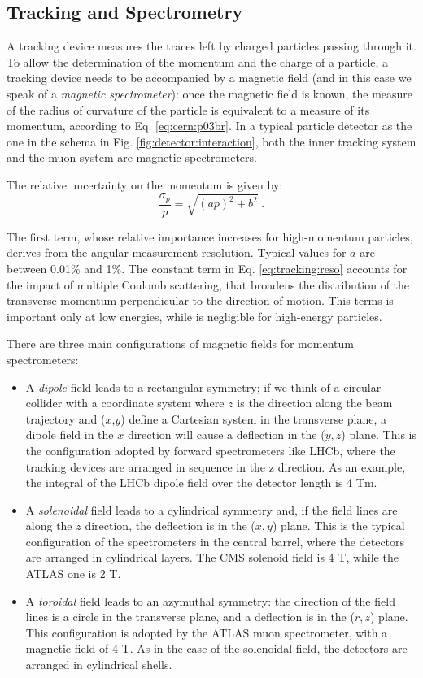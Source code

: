 \subsection{Tracking and Spectrometry}
\label{sec:dec:tracking}
A tracking device measures the traces left by charged particles passing through it. To allow the determination of the momentum and the charge of a particle, a tracking device needs to be accompanied by a magnetic field (and in this case we speak of a \textit{magnetic spectrometer}): once the magnetic field is known, the measure of the radius of curvature of the particle is equivalent to a measure of its momentum, according to Eq. \ref{eq:cern:p03br}. In a typical particle detector as the one in the schema in Fig. \ref{fig:detector:interaction}, both the inner tracking system and the muon system are magnetic spectrometers.

The relative uncertainty on the momentum is given by:
\begin{equation}
\frac{\sigma_p}{p} = \sqrt{ \left(a p \right)^2 + b^2} \; .
\label{eq:tracking:reso}
\end{equation}

The first term, whose relative importance increases for high-momentum particles, derives from the angular measurement resolution. Typical values for $a$ are between 0.01\% and 1\%. The constant term in Eq. \ref{eq:tracking:reso} accounts for the impact of multiple Coulomb scattering, that broadens the distribution of the transverse momentum perpendicular to the direction of motion. This terms is important only at low energies, while is negligible for high-energy particles.

There are three main configurations of magnetic fields for momentum spectrometers:
\begin{itemize}
\item A \textit{dipole} field leads to a rectangular symmetry; if we think of a circular collider with a coordinate system where $z$ is the direction along the beam trajectory and ($x$,$y$) define a Cartesian system in the transverse plane, a dipole  field in the $x$ direction will cause a deflection in the ($y,z$) plane. This is the configuration adopted by forward spectrometers like LHCb, where the tracking devices are arranged in sequence in the z direction. As an example, the integral of the LHCb dipole field over the detector length is 4 Tm.
\item A \textit{solenoidal} field leads to a cylindrical symmetry and, if the field lines are along the $z$ direction, the deflection is in the ($x,y$) plane. This is the typical configuration of the spectrometers in the central barrel, where the detectors are arranged in cylindrical layers. The CMS solenoid field is 4 T, while the ATLAS one is 2 T. 
\item A \textit{toroidal} field leads to an azymuthal symmetry: the direction of the field lines is a circle in the transverse plane, and a deflection is in the ($r,z$) plane. This configuration is adopted by the ATLAS muon spectrometer, with a magnetic field of 4 T. As in the case of the solenoidal field, the detectors are arranged in cylindrical shells.
\end{itemize}


